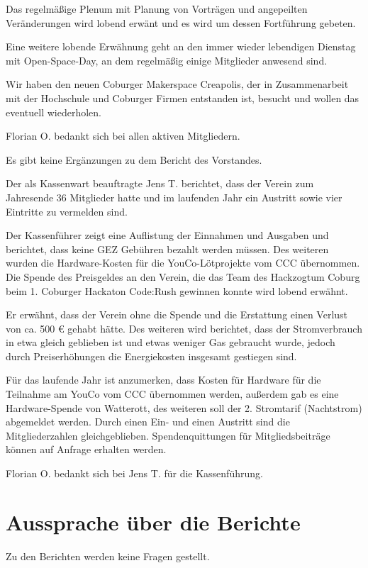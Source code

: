 Das regelmäßige Plenum mit Planung von Vorträgen und angepeilten Veränderungen wird lobend erwänt und es wird um dessen Fortführung gebeten.

Eine weitere lobende Erwähnung geht an den immer wieder lebendigen Dienstag mit Open-Space-Day, an dem regelmäßig einige Mitglieder anwesend sind.

Wir haben den neuen Coburger Makerspace Creapolis, der in Zusammenarbeit mit der Hochschule und Coburger Firmen entstanden ist, besucht und wollen das eventuell wiederholen.

Florian O. bedankt sich bei allen aktiven Mitgliedern.

Es gibt keine Ergänzungen zu dem Bericht des Vorstandes.

Der als Kassenwart beauftragte Jens T. berichtet, dass der Verein zum Jahresende 36 Mitglieder hatte und im laufenden Jahr ein Austritt sowie vier Eintritte zu vermelden sind.

Der Kassenführer zeigt eine Auflistung der Einnahmen und Ausgaben und berichtet, dass keine GEZ Gebühren bezahlt werden müssen.
Des weiteren wurden die Hardware-Kosten für die YouCo-Lötprojekte vom CCC übernommen.
Die Spende des Preisgeldes an den Verein, die das Team des Hackzogtum Coburg beim 1. Coburger Hackaton Code:Rush gewinnen konnte wird lobend erwähnt.

Er erwähnt, dass der Verein ohne die Spende und die Erstattung einen Verlust von ca. 500 € gehabt hätte.
Des weiteren wird berichtet, dass der Stromverbrauch in etwa gleich geblieben ist und etwas weniger Gas gebraucht wurde, jedoch durch Preiserhöhungen die Energiekosten insgesamt gestiegen sind.

Für das laufende Jahr ist anzumerken, dass Kosten für Hardware für die Teilnahme am YouCo vom CCC übernommen werden, außerdem gab es eine Hardware-Spende von Watterott, des weiteren soll der 2. Stromtarif (Nachtstrom) abgemeldet werden. Durch einen Ein- und einen Austritt sind die Mitgliederzahlen gleichgeblieben. Spendenquittungen für Mitgliedsbeiträge können auf Anfrage erhalten werden.

Florian O. bedankt sich bei Jens T. für die Kassenführung.



\section{Aussprache über die Berichte}
Zu den Berichten werden keine Fragen gestellt.

